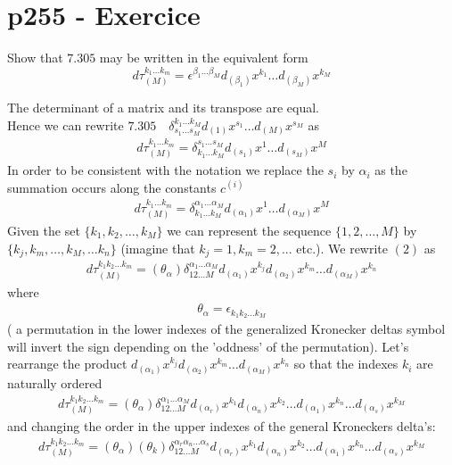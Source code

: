 \section{p255 - Exercice }
\begin{tcolorbox}
Show that $\mathbf{7.305}$ may be written in the equivalent form
$$d\tau_{(M)}^{k_1\dots k_m}= \epsilon^{\beta_1\dots \beta_M}d_{(\beta_1)}x^{k_1}\dots d_{(\beta_M)}x^{k_M}$$
\end{tcolorbox}
The determinant of a matrix and its transpose are equal.\\
Hence we can rewrite $\mathbf{7.305} \quad \delta^{k_1\dots k_M}_{s_1\dots s_M}d_{(1)}x^{s_1}\dots d_{(M)}x^{s_M}$ as
\begin{align}
d\tau_{(M)}^{k_1\dots k_m}=\delta_{k_1\dots k_M}^{s_1\dots s_M}d_{(s_1)}x^{1}\dots d_{(s_M)}x^{M}
\end{align}
In order to be consistent with the notation we replace the $s_i$ by $\alpha_i$ as the summation occurs along the constants $c^{(i)}$
\begin{align}
d\tau_{(M)}^{k_1\dots k_m}=\delta_{k_1\dots k_M}^{\alpha_1\dots \alpha_M}d_{(\alpha_1)}x^{1}\dots d_{(\alpha_M)}x^{M}
\end{align}
Given the set $\{k_1, k_2,\dots , k_M\}$ we can represent the sequence $\{1,2,\dots , M\}$ by $\{k_j, k_m,\dots ,k_M,\dots k_n\}$ (imagine that $k_j=1, k_m=2,...$ etc.). We rewrite $(2)$ as
\begin{align}
d\tau_{(M)}^{k_1 k_2\dots k_m}=(\theta_{\alpha}) \delta_{1 2 \dots M}^{\alpha_1\dots \alpha_M}d_{(\alpha_1)}x^{k_j}d_{(\alpha_2)}x^{k_m}\dots d_{(\alpha_M)}x^{k_n}
\end{align}
where 
\begin{align}
\theta_{\alpha} = \epsilon_{k_1 k_2\dots k_M}
\end{align}
( a permutation in the lower indexes of the generalized Kronecker deltas symbol will invert the sign depending on the 'oddness' of the permutation).
Let's rearrange the product $d_{(\alpha_1)}x^{k_j}d_{(\alpha_2)}x^{k_m}\dots d_{(\alpha_M)}x^{k_n}$ so that the indexes $k_i$ are naturally ordered
\begin{align}
d\tau_{(M)}^{k_1 k_2\dots k_m}=(\theta_{\alpha}) \delta_{1 2 \dots M}^{\alpha_1\dots \alpha_M}d_{(\alpha_r)}x^{k_1}d_{(\alpha_n)}x^{k_2}\dots d_{(\alpha_1)}x^{k_n}\dots d_{(\alpha_s)}x^{k_M}
\end{align}
and changing the order in the upper indexes of the general Kroneckers delta's:
\begin{align}
d\tau_{(M)}^{k_1 k_2\dots k_m}=(\theta_{\alpha})(\theta_{k}) \delta_{1 2 \dots M}^{\alpha_r\alpha_n \dots \alpha_s}d_{(\alpha_r)}x^{k_1}d_{(\alpha_n)}x^{k_2}\dots d_{(\alpha_1)}x^{k_n}\dots d_{(\alpha_s)}x^{k_M}
\end{align}
